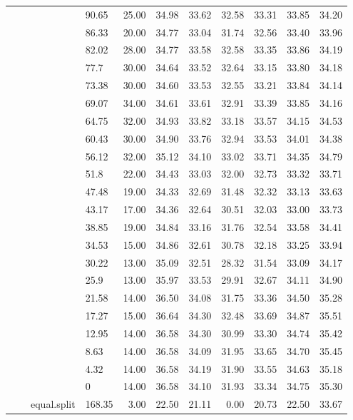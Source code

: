 \begin{longtable}{llllrrrrrrr}
   &  &  & 90.65 & 25.00 & 34.98 & 33.62 & 32.58 & 33.31 & 33.85 & 34.20 \\ 
   &  &  & 86.33 & 20.00 & 34.77 & 33.04 & 31.74 & 32.56 & 33.40 & 33.96 \\ 
   &  &  & 82.02 & 28.00 & 34.77 & 33.58 & 32.58 & 33.35 & 33.86 & 34.19 \\ 
   &  &  & 77.7 & 30.00 & 34.64 & 33.52 & 32.64 & 33.15 & 33.80 & 34.18 \\ 
   &  &  & 73.38 & 30.00 & 34.60 & 33.53 & 32.55 & 33.21 & 33.84 & 34.14 \\ 
   &  &  & 69.07 & 34.00 & 34.61 & 33.61 & 32.91 & 33.39 & 33.85 & 34.16 \\ 
   &  &  & 64.75 & 32.00 & 34.93 & 33.82 & 33.18 & 33.57 & 34.15 & 34.53 \\ 
   &  &  & 60.43 & 30.00 & 34.90 & 33.76 & 32.94 & 33.53 & 34.01 & 34.38 \\ 
   &  &  & 56.12 & 32.00 & 35.12 & 34.10 & 33.02 & 33.71 & 34.35 & 34.79 \\ 
   &  &  & 51.8 & 22.00 & 34.43 & 33.03 & 32.00 & 32.73 & 33.32 & 33.71 \\ 
   &  &  & 47.48 & 19.00 & 34.33 & 32.69 & 31.48 & 32.32 & 33.13 & 33.63 \\ 
   &  &  & 43.17 & 17.00 & 34.36 & 32.64 & 30.51 & 32.03 & 33.00 & 33.73 \\ 
   &  &  & 38.85 & 19.00 & 34.84 & 33.16 & 31.76 & 32.54 & 33.58 & 34.41 \\ 
   &  &  & 34.53 & 15.00 & 34.86 & 32.61 & 30.78 & 32.18 & 33.25 & 33.94 \\ 
   &  &  & 30.22 & 13.00 & 35.09 & 32.51 & 28.32 & 31.54 & 33.09 & 34.17 \\ 
   &  &  & 25.9 & 13.00 & 35.97 & 33.53 & 29.91 & 32.67 & 34.11 & 34.90 \\ 
   &  &  & 21.58 & 14.00 & 36.50 & 34.08 & 31.75 & 33.36 & 34.50 & 35.28 \\ 
   &  &  & 17.27 & 15.00 & 36.64 & 34.30 & 32.48 & 33.69 & 34.87 & 35.51 \\ 
   &  &  & 12.95 & 14.00 & 36.58 & 34.30 & 30.99 & 33.30 & 34.74 & 35.42 \\ 
   &  &  & 8.63 & 14.00 & 36.58 & 34.09 & 31.95 & 33.65 & 34.70 & 35.45 \\ 
   &  &  & 4.32 & 14.00 & 36.58 & 34.19 & 31.90 & 33.55 & 34.63 & 35.18 \\ 
   &  &  & 0 & 14.00 & 36.58 & 34.10 & 31.93 & 33.34 & 34.75 & 35.30 \\ 
   &  & equal.split & 168.35 & 3.00 & 22.50 & 21.11 & 0.00 & 20.73 & 22.50 & 33.67 \\ 

\end{longtable}
